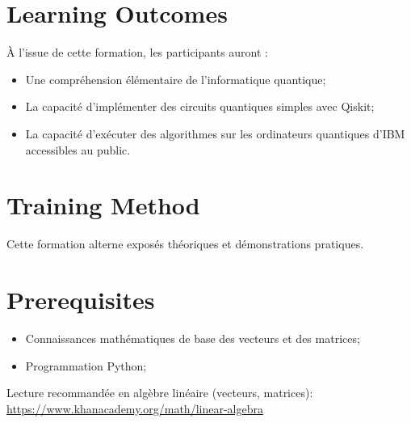 \documentclass[11pt]{article}
\begin{document}
\section*{Learning Outcomes}

À l’issue de cette formation, les participants auront :

\begin{itemize}[leftmargin=*,itemsep=0.4em]
\item Une compréhension élémentaire de l’informatique quantique;
\item La capacité d’implémenter des circuits quantiques simples avec Qiskit;
\item La capacité d’exécuter des algorithmes sur les ordinateurs quantiques d’IBM accessibles au public.
\end{itemize}

\section*{Training Method}

Cette formation alterne exposés théoriques et démonstrations pratiques.

\section*{Prerequisites}

\begin{itemize}[leftmargin=*,itemsep=0.4em]
\item Connaissances mathématiques de base des vecteurs et des matrices;
\item Programmation Python;
\end{itemize}

Lecture recommandée en algèbre linéaire (vecteurs, matrices):
\url{https://www.khanacademy.org/math/linear-algebra}
\end{document}
